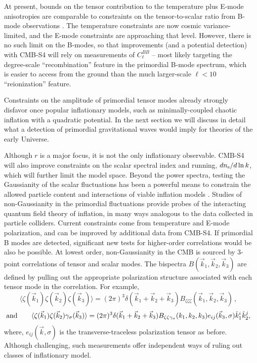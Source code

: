 At present, bounds on the tensor contribution to the temperature plus E-mode anisotropies are comparable to constraints on the tensor-to-scalar ratio from B-mode observations \cite{Ade:2013uln,Ade:2015lrj}. The temperature constraints are now cosmic variance-limited, and the E-mode constraints are approaching that level.  However, there is no such
limit on the B-modes, so that improvements (and a potential detection) with CMB-S4 will rely on measurements of $C_\ell^{BB}$ -- most likely targeting the degree-scale ``recombination'' feature in the primordial B-mode spectrum, which is easier to access from the ground than the much larger-scale $\ell < 10$ ``reionization'' feature.

Constraints on the amplitude of primordial tensor modes already strongly disfavor once popular inflationary models, such as minimally-coupled chaotic inflation with a quadratic potential. In the next section we will discuss in detail what a detection of primordial gravitational waves would imply for theories of the early Universe. 

Although $r$ is a major focus, it is not the only inflationary observable.
CMB-S4 will also improve constraints on the scalar spectral index and
running, $dn_{\rm s}/d\ln k$, which will further limit the model space.
Beyond the power spectra,
testing the Gaussianity of the scalar fluctuations has been a powerful means to constrain the allowed particle content and interactions of viable inflation models \cite{Ade:2013ydc,Ade:2015ava}. Studies of non-Gaussianity in the primordial fluctuations provide probes of the interacting quantum field theory of inflation, in many ways analogous to the data collected in particle colliders. Current constraints come from temperature and E-mode polarization, and can be improved by additional data from CMB-S4. If primordial B modes are detected, significant new tests for higher-order correlations would be also be possible. At lowest order, non-Gaussianity in the CMB is sourced by 3-point correlations of tensor and scalar modes. The bispectra $B(\vec{k}_1,\vec{k}_2,\vec{k}_3)$ are defined by pulling out the appropriate polarization structure associated with each tensor mode in the correlation. For example,
\begin{equation}
\label{eq:Bsss}
\langle\zeta(\vec{k}_1)\zeta(\vec{k}_2)\zeta(\vec{k}_3)\rangle=(2\pi)^3\delta(\vec{k}_1+\vec{k}_2+\vec{k}_3)B_{\zeta\zeta\zeta}(\vec{k}_1,\vec{k}_2,\vec{k}_3)\,,
\end{equation}
\begin{equation}
\label{eq:Bsst}
{\rm and}\qquad \langle \zeta(\vec{k}_1)\zeta(\vec{k}_2)\gamma_\sigma(\vec{k}_3) \rangle = (2\pi)^3 \delta(\vec{k}_1+\vec{k}_2+\vec{k}_3) B_{\zeta\zeta\gamma_\sigma}(k_1,k_2,k_3) e_{ij}(\vec{k}_3,\sigma)\hat{k}_1^i \hat{k}_2^j, 
\end{equation}
where, $e_{ij}(\vec{k},\sigma)$ is the transverse-traceless polarization tensor as before.  Although challenging, such measurements offer independent ways of ruling out classes of inflationary model.

